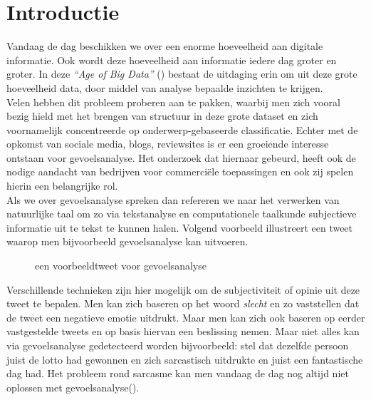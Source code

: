 \chapter{Introductie}\label{introductie}

Vandaag de dag beschikken we over een enorme hoeveelheid aan digitale informatie. Ook wordt deze hoeveelheid aan informatie iedere dag groter en groter. 
In deze \textit{``Age of Big Data''} (\cite{lohr2012age}) bestaat de uitdaging erin om uit deze grote hoeveelheid data, door middel van analyse bepaalde inzichten te krijgen.
\\
Velen hebben dit probleem proberen aan te pakken, waarbij men zich vooral bezig hield met het brengen van structuur in deze grote dataset en zich voornamelijk concentreerde op onderwerp-gebaseerde classificatie. Echter met de opkomst van sociale media, blogs, reviewsites is er een groeiende interesse ontstaan voor gevoelsanalyse. Het onderzoek dat hiernaar gebeurd, heeft ook de nodige aandacht van bedrijven voor commerci\"ele toepassingen en ook zij spelen hierin een belangrijke rol.\\
Als we over gevoelsanalyse spreken dan refereren we naar het verwerken van natuurlijke taal  om zo via tekstanalyse en computationele taalkunde subjectieve informatie uit te tekst te kunnen halen. Volgend voorbeeld illustreert een tweet waarop men bijvoorbeeld gevoelsanalyse kan uitvoeren.\\

\begin{figure}[h]%
    \centering
    \caption{een voorbeeldtweet voor gevoelsanalyse}%
\end{figure}
\newline

Verschillende technieken zijn hier mogelijk om de subjectiviteit of opinie uit deze tweet te bepalen. Men kan zich baseren op het woord \textit{slecht} en zo vaststellen dat de tweet een negatieve emotie uitdrukt. Maar men kan zich ook baseren op eerder vastgestelde tweets en op basis hiervan een beslissing nemen. Maar niet alles kan via gevoelsanalyse gedetecteerd worden bijvoorbeeld: stel dat dezelfde persoon juist de lotto had gewonnen en zich sarcastisch uitdrukte en juist een fantastische dag had. Het probleem rond sarcasme kan men vandaag de dag nog altijd niet oplossen met gevoelsanalyse(\cite{liebrecht2013perfect}).\\ 


